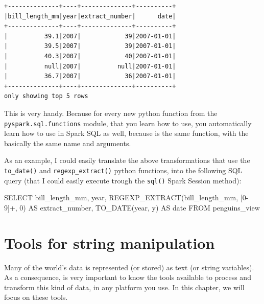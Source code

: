 \documentclass[
  11pt,
  letterpaper,
  DIV=11,
  numbers=noendperiod]{scrreprt}
\newenvironment{Shaded}{\begin{snugshade}}{\end{snugshade}}
\newcommand{\DataTypeTok}[1]{\textcolor[rgb]{0.68,0.00,0.00}{#1}}
\newcommand{\DecValTok}[1]{\textcolor[rgb]{0.68,0.00,0.00}{#1}}
\newcommand{\FunctionTok}[1]{\textcolor[rgb]{0.28,0.35,0.67}{#1}}
\newcommand{\KeywordTok}[1]{\textcolor[rgb]{0.00,0.23,0.31}{#1}}
\newcommand{\NormalTok}[1]{\textcolor[rgb]{0.00,0.23,0.31}{#1}}
\newcommand{\StringTok}[1]{\textcolor[rgb]{0.13,0.47,0.30}{#1}}
\begin{document}
\begin{verbatim}
+--------------+----+--------------+----------+
|bill_length_mm|year|extract_number|      date|
+--------------+----+--------------+----------+
|          39.1|2007|            39|2007-01-01|
|          39.5|2007|            39|2007-01-01|
|          40.3|2007|            40|2007-01-01|
|          null|2007|          null|2007-01-01|
|          36.7|2007|            36|2007-01-01|
+--------------+----+--------------+----------+
only showing top 5 rows
\end{verbatim}

This is very handy. Because for every new python function from the
\texttt{pyspark.sql.functions} module, that you learn how to use, you
automatically learn how to use in Spark SQL as well, because is the same
function, with the basically the same name and arguments.

As an example, I could easily translate the above transformations that
use the \texttt{to\_date()} and \texttt{regexp\_extract()} python
functions, into the following SQL query (that I could easily execute
trough the \texttt{sql()} Spark Session method):

\begin{Shaded}
\begin{Highlighting}[]
\KeywordTok{SELECT} 
\NormalTok{  bill\_length\_mm, }\DataTypeTok{year}\NormalTok{,}
\NormalTok{  REGEXP\_EXTRACT(bill\_length\_mm, }\StringTok{\textquotesingle{}[0{-}9]+\textquotesingle{}}\NormalTok{, }\DecValTok{0}\NormalTok{) }\KeywordTok{AS}\NormalTok{ extract\_number,}
  \FunctionTok{TO\_DATE}\NormalTok{(}\DataTypeTok{year}\NormalTok{, }\StringTok{\textquotesingle{}y\textquotesingle{}}\NormalTok{) }\KeywordTok{AS} \DataTypeTok{date}
\KeywordTok{FROM}\NormalTok{ penguins\_view}
\end{Highlighting}
\end{Shaded}


\hypertarget{sec-string-tools}{%
\chapter{Tools for string manipulation}\label{sec-string-tools}}

Many of the world's data is represented (or stored) as text (or string
variables). As a consequence, is very important to know the tools
available to process and transform this kind of data, in any platform
you use. In this chapter, we will focus on these tools.
\end{document}

